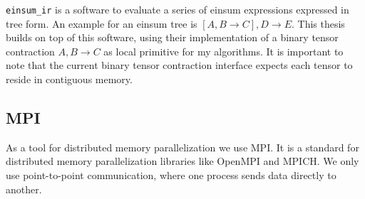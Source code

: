 \texttt{einsum\_ir}\cite{einsum_ir} is a software to evaluate a series of einsum expressions expressed in tree form.
An example for an einsum tree is $[A,B\rightarrow C],D \rightarrow E$.
This thesis builds on top of this software, using their implementation of a binary tensor contraction $A,B \rightarrow C$ as local primitive for my algorithms.
It is important to note that the current binary tensor contraction interface expects each tensor to reside in contiguous memory.


\subsection{MPI}

As a tool for distributed memory parallelization we use MPI.
It is a standard for distributed memory parallelization libraries like OpenMPI and MPICH.
We only use point-to-point communication, where one process sends data directly to another.